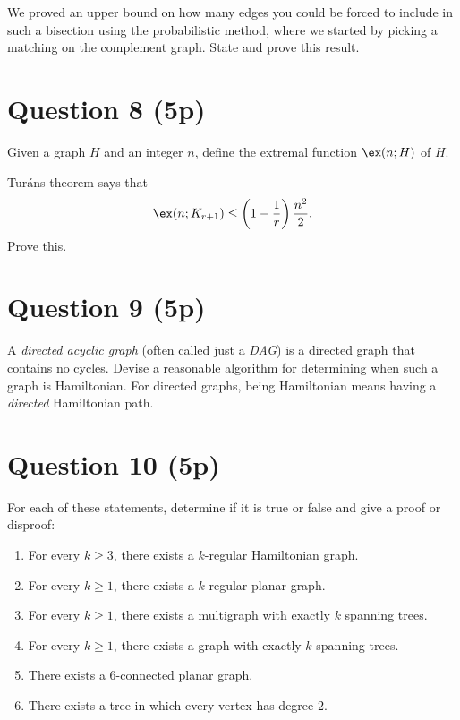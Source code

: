 \documentclass[nobib]{tufte-handout}
\begin{document}
We proved an upper bound on how many edges you could be forced to include in such a bisection using the probabilistic method, where we started by picking a matching on the complement graph. State and prove this result.

\section{Question 8 (5p)} %

Given a graph $H$ and an integer $n$, define the extremal function $\ex(n; H)$ of $H$.

Turáns theorem says that
$$\ex(n; K_{r+1}) \leq \left(1 - \frac{1}{r}\right)\frac{n^2}{2}.$$
Prove this.

\section{Question 9 (5p)} %

A \emph{directed acyclic graph} (often called just a \emph{DAG}) is a directed graph that contains no cycles. Devise a reasonable algorithm for determining when such a graph is Hamiltonian. For directed graphs, being Hamiltonian means having a \emph{directed} Hamiltonian path.

\section{Question 10 (5p)} %

For each of these statements, determine if it is true or false and give a proof or disproof:
\begin{enumerate}[label=\alph*)]
  \item For every $k\geq 3$, there exists a $k$-regular Hamiltonian graph.
  \item For every $k \geq 1$, there exists a $k$-regular planar graph.
  \item For every $k \geq 1$, there exists a multigraph with exactly $k$ spanning trees.
  \item For every $k \geq 1$, there exists a graph with exactly $k$ spanning trees.
  \item There exists a $6$-connected planar graph.
  \item There exists a tree in which every vertex has degree $2$.
\end{enumerate}
\end{document}
